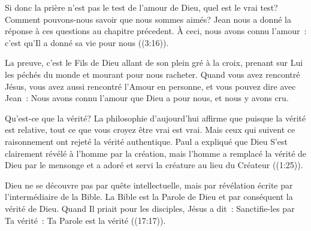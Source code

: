 Si donc la prière n'est pas le test de l'amour de Dieu, quel est le vrai test?
 Comment pouvons-nous savoir que nous sommes aimés?
 Jean nous a donné la réponse à ces questions au chapitre précedent.
 \og À ceci, nous avons connu l'amour~:
 c'est qu'Il a donné sa vie pour nous \fg{} ((3:16)). 


La preuve, c'est le Fils de Dieu allant de son plein gré à la croix,
 prenant sur Lui les péchés du monde et mourant pour nous racheter.
 Quand vous avez rencontré Jésus, vous avez aussi rencontré
 l'Amour en personne, et vous pouvez dire avec Jean~: 
 \og Nous avons connu l'amour que Dieu a pour nous, et nous y avons cru. \fg{}

\dvrule







Qu'est-ce que la vérité? La philosophie d'aujourd'hui affirme que 
 \og puisque la vérité est relative, \fg{} 
 tout ce que vous croyez être vrai est vrai.
 Mais ceux qui suivent ce raisonnement ont rejeté la vérité authentique.
 Paul a expliqué que Dieu S'est clairement révélé à l'homme par la création,
 mais l'homme \og a remplacé la vérité de Dieu par le mensonge
 et a adoré et servi la créature au lieu du Créateur \fg{}
 ((1:25)). 


Dieu ne se découvre pas par quête intellectuelle, mais par révélation écrite
 \ocadr par l'intermédiaire de la Bible.
 La Bible est la Parole de Dieu et par conséquent la vérité de Dieu.
 Quand Il priait pour les disciples, Jésus a dit~: 
 \og Sanctifie-les par Ta vérité~: Ta Parole est la vérité \fg{} 
 ((17:17)). 


